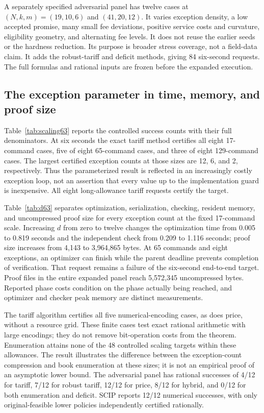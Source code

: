 A separately specified adversarial panel has twelve cases at $(N,k,m)=(19,10,6)$ and $(41,20,12)$. It varies exception density, a low accepted promise, many small fee deviations, positive service costs and curvature, eligibility geometry, and alternating fee levels. It does not reuse the earlier seeds or the hardness reduction. Its purpose is broader stress coverage, not a field-data claim. It adds the robust-tariff and deficit methods, giving 84 six-second requests. The full formulas and rational inputs are frozen before the expanded execution.

\subsection{The exception parameter in time, memory, and proof size}
Table~\ref{tab:scaling63} reports the controlled success counts with their full denominators. At six seconds the exact tariff method certifies all eight 17-command cases, five of eight 65-command cases, and three of eight 129-command cases. The largest certified exception counts at those sizes are 12, 6, and 2, respectively. Thus the parameterized result is reflected in an increasingly costly exception loop, not an assertion that every value up to the implementation guard is inexpensive. All eight long-allowance tariff requests certify the target.

Table~\ref{tab:d63} separates optimization, serialization, checking, resident memory, and uncompressed proof size for every exception count at the fixed 17-command scale. Increasing $d$ from zero to twelve changes the optimization time from 0.005 to 0.819 seconds and the independent check from 0.209 to 1.116 seconds; proof size increases from 4,143 to 3,964,865 bytes. At 65 commands and eight exceptions, an optimizer can finish while the parent deadline prevents completion of verification. That request remains a failure of the six-second end-to-end target. Proof files in the entire expanded panel reach 5,572,345 uncompressed bytes. Reported phase costs condition on the phase actually being reached, and optimizer and checker peak memory are distinct measurements.

The tariff algorithm certifies all five numerical-encoding cases, as does price, without a resource grid. These finite cases test exact rational arithmetic with large encodings; they do not remove bit-operation costs from the theorem. Enumeration attains none of the 48 controlled scaling targets within these allowances. The result illustrates the difference between the exception-count compression and book enumeration at these sizes; it is not an empirical proof of an asymptotic lower bound. The adversarial panel has rational successes of 4/12 for tariff, 7/12 for robust tariff, 12/12 for price, 8/12 for hybrid, and 0/12 for both enumeration and deficit. SCIP reports 12/12 numerical successes, with only original-feasible lower policies independently certified rationally.

